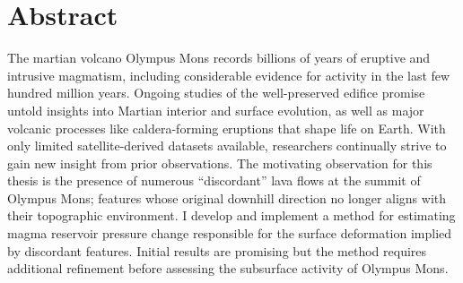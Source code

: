 \chapter{Abstract}
The martian volcano Olympus Mons records billions of years of eruptive and intrusive magmatism, including considerable evidence for activity in the last few hundred million years. Ongoing studies of the well-preserved edifice promise untold insights into Martian interior and surface evolution, as well as major volcanic processes like caldera-forming eruptions that shape life on Earth. With only limited satellite-derived datasets available, researchers continually strive to gain new insight from prior observations. The motivating observation for this thesis is the presence of numerous ``discordant'' lava flows at the summit of Olympus Mons; features whose original downhill direction no longer aligns with their topographic environment. I develop and implement a method for estimating magma reservoir pressure change responsible for the surface deformation implied by discordant features. Initial results are promising but the method requires additional refinement before assessing the subsurface activity of Olympus Mons.
